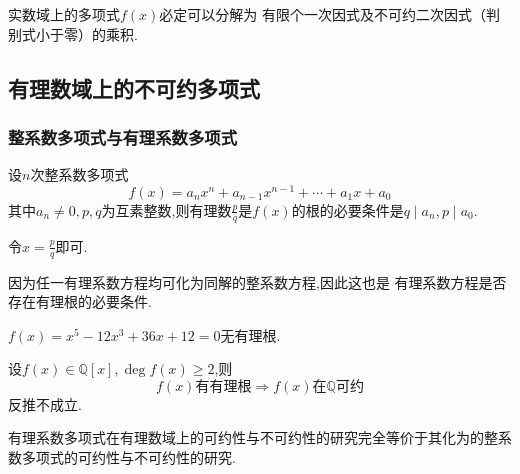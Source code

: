 \begin{green}
\begin{corollary}[因式分解定理]\label{cor:因式分解定理}
    实数域上的多项式$f\left(x\right)$必定可以分解为
    有限个一次因式及不可约二次因式（判别式小于零）的乘积.
\end{corollary}
\end{green}
\subsection{有理数域上的不可约多项式}
\subsubsection{整系数多项式与有理系数多项式}
\begin{formal}
\begin{theorem}[整系数多项式存在有理根的必要条件]\label{thm:整系数多项式存在有理根的必要条件}
    设$n$次整系数多项式
    \[
    f\left(x\right)=a_nx^n+a_{n-1}x^{n-1}+\cdots+a_1x+a_0
    \]
    其中$a_n\neq 0,p,q$为互素整数,则有理数$\displaystyle
    \frac{p}{q}$是$f\left(x\right)$的根的必要条件是$q\mid a_n,p\mid a_0.$
\end{theorem}
\begin{Proof}
令$\displaystyle
x=\frac{p}{q}$即可.
\end{Proof}
\end{formal}
\begin{red}
\begin{remark}
    因为任一有理系数方程均可化为同解的整系数方程,因此这也是
有理系数方程是否存在有理根的必要条件.
\end{remark}
\end{red}
\begin{brown}
\begin{example}
$    f\left(x\right)=x^5-12x^3+36x+12=0$无有理根.
\end{example}
\end{brown}
\begin{red}
\begin{remark}
    设$f\left(x\right)\in\mathbb{Q}\left[x\right],\deg f\left(x\right)\geqslant 2$,则
    \[
    f\left(x\right)\text{有有理根}\Longrightarrow
    f\left(x\right)\text{在}\mathbb{Q}\text{可约}
    \]
    反推不成立.
\end{remark}
\end{red}
\begin{red}
\begin{remark}
    有理系数多项式在有理数域上的可约性与不可约性的研究完全等价于其化为的整系
    数多项式的可约性与不可约性的研究.
\end{remark}
\end{red}
